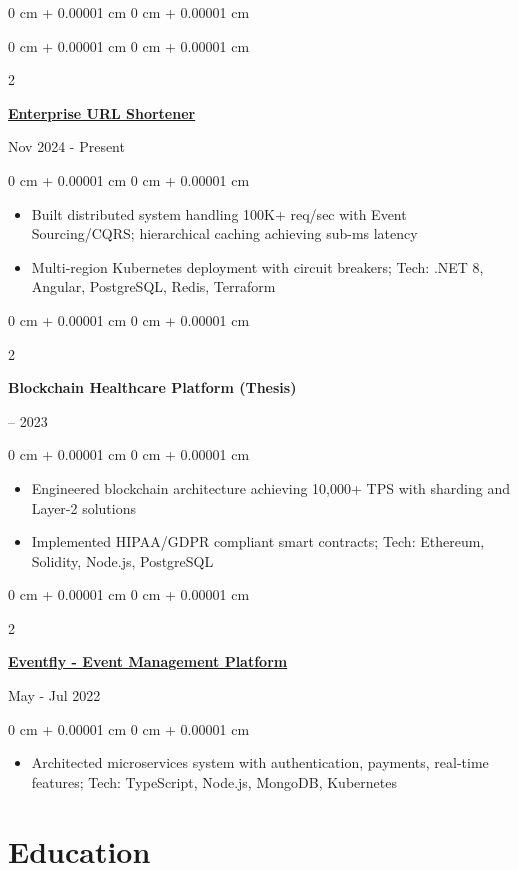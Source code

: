 \documentclass[10pt, letterpaper]{article}
\newenvironment{highlights}{
    \begin{itemize}[
        topsep=0.05 cm,
        parsep=0.05 cm,
        partopsep=0pt,
        itemsep=0pt,
        leftmargin=0 cm + 10pt
    ]
}{
    \end{itemize}
} %
\newenvironment{onecolentry}{
    \begin{adjustwidth}{
        0 cm + 0.00001 cm
    }{
        0 cm + 0.00001 cm
    }
}{
    \end{adjustwidth}
} %
\newenvironment{twocolentry}[2][]{
    \onecolentry
    \def\secondColumn{#2}
    \setcolumnwidth{\fill, 4.5 cm}
    \begin{paracol}{2}
}{
    \switchcolumn \raggedleft \secondColumn
    \end{paracol}
    \endonecolentry
} %
\newenvironment{header}{
    \setlength{\topsep}{0pt}\par\kern\topsep\centering\linespread{0.95}
}{
    \par\kern\topsep
} %
\begin{document}
\begin{header}
\begin{onecolentry}
        \begin{twocolentry}{
            Nov 2024 - Present
        }
            \href{https://github.com/thromel/URLShortener}{\textbf{Enterprise URL Shortener}}
        \end{twocolentry}
        \begin{onecolentry}
            \begin{highlights}
                \item Built distributed system handling 100K+ req/sec with Event Sourcing/CQRS; hierarchical caching achieving sub-ms latency
                \item Multi-region Kubernetes deployment with circuit breakers; Tech: .NET 8, Angular, PostgreSQL, Redis, Terraform
            \end{highlights}
        \end{onecolentry}

        \begin{twocolentry}{
            2022 – 2023
        }
            \textbf{Blockchain Healthcare Platform (Thesis)}
        \end{twocolentry}
        \begin{onecolentry}
            \begin{highlights}
                \item Engineered blockchain architecture achieving 10,000+ TPS with sharding and Layer-2 solutions
                \item Implemented HIPAA/GDPR compliant smart contracts; Tech: Ethereum, Solidity, Node.js, PostgreSQL
            \end{highlights}
        \end{onecolentry}

        \begin{twocolentry}{
            May - Jul 2022
        }
            \href{https://github.com/eventfly/Microservices}{\textbf{Eventfly - Event Management Platform}}
        \end{twocolentry}
        \begin{onecolentry}
            \begin{highlights}
                \item Architected microservices system with authentication, payments, real-time features; Tech: TypeScript, Node.js, MongoDB, Kubernetes
            \end{highlights}
        \end{onecolentry}

    \section{Education}
 

\end{onecolentry}
\end{header}
\end{document}
